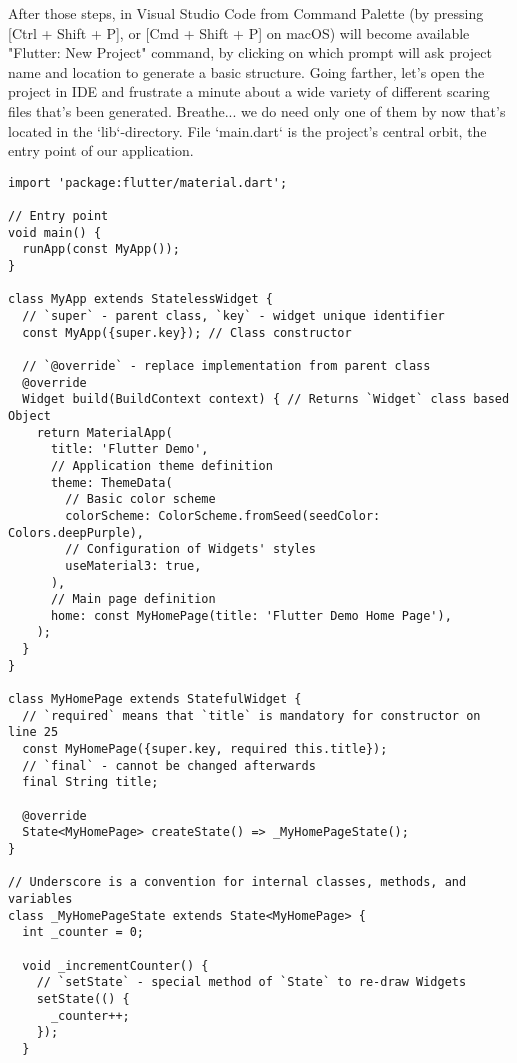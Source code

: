 After those steps, in Visual Studio Code from Command Palette (by pressing [Ctrl + Shift + P], or [Cmd + Shift + P] 
on macOS) will become available "Flutter: New Project" command, by clicking on which prompt will ask project name 
and location to generate a basic structure. Going farther, let's open the project in IDE and frustrate a minute 
about a wide variety of different scaring files that's been generated. Breathe... we do need only one of them by 
now that's located in the `lib`-directory. File `main.dart` is the project's central orbit, the entry point of our 
application.

\begin{lstlisting}
import 'package:flutter/material.dart';

// Entry point
void main() {
  runApp(const MyApp());
}

class MyApp extends StatelessWidget {
  // `super` - parent class, `key` - widget unique identifier
  const MyApp({super.key}); // Class constructor
  
  // `@override` - replace implementation from parent class
  @override
  Widget build(BuildContext context) { // Returns `Widget` class based Object
    return MaterialApp(
      title: 'Flutter Demo',
      // Application theme definition
      theme: ThemeData(
        // Basic color scheme
        colorScheme: ColorScheme.fromSeed(seedColor: Colors.deepPurple),
        // Configuration of Widgets' styles
        useMaterial3: true,
      ),
      // Main page definition
      home: const MyHomePage(title: 'Flutter Demo Home Page'),
    );
  }
}

class MyHomePage extends StatefulWidget {
  // `required` means that `title` is mandatory for constructor on line 25
  const MyHomePage({super.key, required this.title});
  // `final` - cannot be changed afterwards
  final String title;

  @override
  State<MyHomePage> createState() => _MyHomePageState();
}

// Underscore is a convention for internal classes, methods, and variables
class _MyHomePageState extends State<MyHomePage> {
  int _counter = 0;

  void _incrementCounter() {
    // `setState` - special method of `State` to re-draw Widgets
    setState(() {
      _counter++;
    });
  }


\end{lstlisting}

